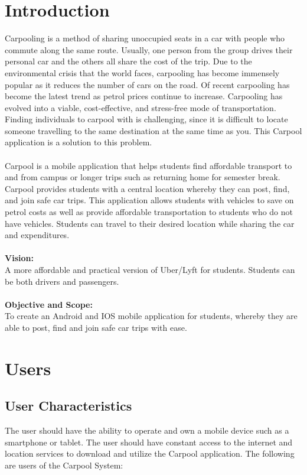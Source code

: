 \documentclass[hidelinks, 12pt, a4paper]{article}
\begin{document}
\section{Introduction}
Carpooling is a method of sharing unoccupied seats in a car with people who commute along the same route. Usually, one person from the group drives their personal car and the others all share the cost of the trip. Due to the environmental crisis that the world faces, carpooling has become immensely popular as it reduces the number of cars on the road. Of recent carpooling has become the latest trend as petrol prices continue to increase. Carpooling has evolved into a viable, cost-effective, and stress-free mode of transportation. Finding individuals to carpool with is challenging, since it is difficult to locate someone travelling to the same destination at the same time as you. This Carpool application is a solution to this problem. \\ \\
Carpool is a mobile application that helps students find affordable transport to and from campus or longer trips such as returning home for semester break. Carpool provides students with a central location whereby they can post, find, and join safe car trips. This application allows students with vehicles to save on petrol costs as well as provide affordable transportation to students who do not have vehicles. Students can travel to their desired location while sharing the car and expenditures.\\ \\
\textbf{Vision:}\\
A more affordable and practical version of Uber/Lyft for students. Students can be both drivers and passengers.\\ \\
\textbf{Objective and Scope:} \\
To create an Android and IOS mobile application for students, whereby they are able to post, find and join safe car trips with ease.

\newpage
\section{Users}

\subsection{User Characteristics}

The user should have the ability to operate and own a mobile device such as a smartphone or tablet. The user should have constant access to the internet and location services to download and utilize the Carpool application. The following are users of the Carpool System:\\
\end{document}
